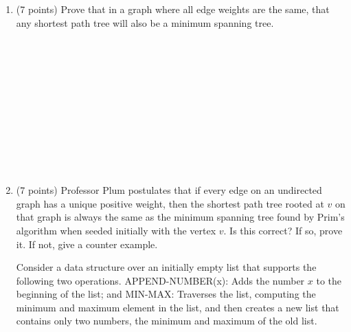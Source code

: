 \documentclass[11pt]{article}
\newcommand{\ans}[1]{ }
\begin{document}
\begin{enumerate}
 
 
 
 \begin{enumerate}
 \item (7 points) Prove that in a graph where all edge weights are the same, that any shortest path tree will also be a minimum spanning tree.
 
\ans{In such a graph, any spanning tree is also a MST since any spanning tree contains exactly $n-1$ edges} \ \\ \ \\ \ \\ \ \\ \ \\ \ \\ \ \\ \ \\ \ \\ \ \\
  
\pagebreak
 
 \item (7 points) Professor Plum postulates that if every edge on an undirected graph has a unique positive weight, then the shortest path tree rooted at $v$ on that graph is always the same as the minimum spanning tree found by Prim's algorithm when seeded initially with the vertex $v$.  Is this correct?  If so, prove it.  If not, give a counter example.

\ans{No.  Consider the graph over vertices $v,w,x$ where edge $(v,w)$ has weight $1$, edge $(v,x)$ has weight $2.5$ and edge $(w,x)$ has weight $2$.  The shortest path tree for $v$ is edges $(v,w)$ and $(v,x)$.  The MST found by Prim's when started at $v$ is $(v,x)$ and $(w,x)$.}

\pagebreak

Consider a data structure over an initially empty list that supports the following two operations.  APPEND-NUMBER(x): Adds the number $x$ to the beginning of the list; and MIN-MAX: Traverses the list, computing the minimum and maximum element in the list, and then creates a new list that contains only two numbers, the minimum and maximum of the old list. 


\end{enumerate}
\end{enumerate}
\end{document}
